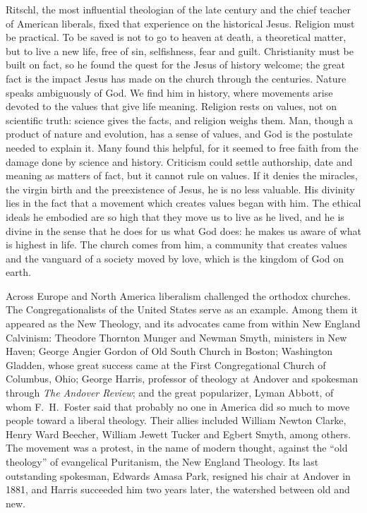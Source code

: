 Ritschl, the most influential theologian of the late century and the chief teacher of American
liberals, fixed that experience on the historical Jesus. Religion must be practical. To be saved is
not to go to heaven at death, a theoretical matter, but to live a new life, free of sin, selfishness,
fear and guilt. Christianity must be built on fact, so he found the quest for the Jesus of history welcome; the great fact is the impact Jesus has made on the church through the centuries. Nature speaks
ambiguously of God. We find him in history, where movements arise devoted to the values that give
life meaning. Religion rests on values, not on scientific truth: science gives the facts, and
religion weighs them. Man, though a product of nature and evolution, has a sense of values, and God
is the postulate needed to explain it. Many found this helpful, for it seemed to free faith from the
damage done by science and history. Criticism could settle authorship, date and meaning as matters of
fact, but it cannot rule on values. If it denies the miracles, the virgin birth and the preexistence
of Jesus, he is no less valuable. His divinity lies in the fact that a movement which creates values began with him. The ethical ideals he embodied are so high that they move us to live as he lived, and he is divine in the sense that he does for us what God does: he makes us aware of what is highest in life. The church comes from him, a community that creates values and the vanguard of a society moved by love, which is the kingdom of God on earth.

Across Europe and North America liberalism challenged the orthodox churches. The Congregationalists of
the United States serve as an example. Among them it appeared as the New Theology, and its advocates
came from within New England Calvinism: Theodore Thornton Munger and Newman Smyth, ministers in New
Haven; George Angier Gordon of Old South Church in Boston; Washington Gladden, whose great success
came at the First Congregational Church of Columbus, Ohio; George Harris, professor of theology at
Andover and spokesman through \emph{The Andover Review}; and the great popularizer, Lyman Abbott, of
whom F.~H.~Foster said that probably no one in America did so much to move people toward a liberal
theology. Their allies included William Newton Clarke, Henry Ward Beecher, William Jewett Tucker and Egbert Smyth, among others. The movement was a protest, in the name of modern thought,
against the ``old theology'' of evangelical Puritanism, the New England Theology. Its last
outstanding spokesman, Edwards Amasa Park, resigned his chair at Andover in 1881, and Harris
succeeded him two years later, the watershed between old and new.


